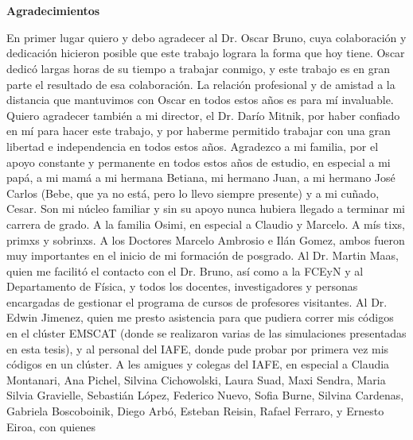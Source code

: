 \pagestyle{empty}
\chapter*{}
\clearpage \pagebreak 
\begin{center}
\begin{large}
\textbf{Agradecimientos}
\end{large}
\end{center}

\vspace{1cm}
En primer lugar quiero y debo agradecer al Dr. Oscar Bruno, cuya 
colaboración y dedicación hicieron posible que 
este trabajo lograra la forma que hoy tiene. Oscar dedicó largas 
horas de su tiempo a trabajar conmigo, 
y este trabajo es en gran parte el resultado de esa colaboración. 
La relación profesional y de amistad a la distancia que mantuvimos 
con Oscar en todos estos años es para mí invaluable. 
Quiero agradecer también a mi director, el Dr. Darío Mitnik, por 
haber confiado en mí para hacer este trabajo, y por haberme permitido 
trabajar con una gran libertad e independencia en todos estos años. 
Agradezco a mi familia, por el apoyo constante y permanente 
en todos estos años de estudio, en especial a mi papá, a mi mamá  
a mi hermana Betiana, mi hermano Juan, a mi hermano José Carlos (Bebe, que ya no está, 
pero lo llevo siempre presente) y a mi cuñado, Cesar. 
Son mi núcleo familiar y sin su apoyo nunca hubiera llegado a terminar mi 
carrera de grado. A la familia Osimi, en especial a 
Claudio y Marcelo. A mís tixs, primxs y sobrinxs.
A los Doctores Marcelo Ambrosio e Ilán Gomez, 
ambos fueron muy importantes en el inicio de mi formación de posgrado. 
Al Dr. Martin Maas, quien me facilitó el contacto con el Dr. Bruno, 
así como a la FCEyN y al Departamento de Física, y todos los docentes, 
investigadores y personas encargadas de gestionar el programa de cursos de profesores visitantes. 
Al Dr. Edwin 
Jimenez, quien me presto asistencia para que pudiera correr mis códigos 
en el clúster EMSCAT (donde se realizaron varias de las simulaciones 
presentadas en esta tesis), y al personal del IAFE, 
donde pude probar por primera vez mis códigos en un clúster.
 A les amigues y colegas del IAFE, en especial a 
Claudia Montanari, Ana Pichel, Silvina Cichowolski, Laura Suad, Maxi Sendra, Maria Silvia Gravielle, Sebastián López, 
Federico Nuevo, Sofia Burne, Silvina Cardenas, Gabriela Boscoboinik, Diego Arbó, Esteban Reisin, Rafael Ferraro,  y Ernesto Eiroa, con quienes 
